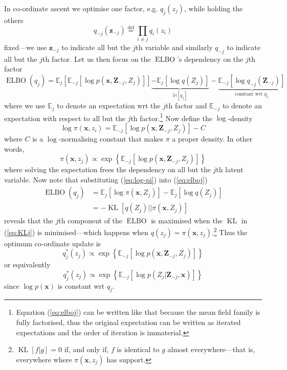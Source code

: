 \documentclass[11pt]{article}
\DeclareMathOperator{\KL}{KL}
\DeclareMathOperator{\ELBO}{ELBO}
\newcommand{\x}{\ensuremath{\mathbf x}}
\newcommand{\z}{\ensuremath{\mathbf z}}
\newcommand{\Z}{\ensuremath{\mathbf Z}}
\begin{document}
In co-ordinate ascent we optimise one factor, e.g. $q_j(z_j)$, while holding the others \begin{equation}
q_{-j}(\z_{-j}) \overset{\text{def}}{=} \prod_{i\neq j} q_i(z_i)
\end{equation}
fixed---we use $\z_{-j}$ to indicate all but the $j$th variable and similarly $q_{-j}$ to indicate all but the $j$th factor.
Let us then focus on the $\ELBO$'s dependency on the $j$th factor
\begin{equation}\label{eq:elboj}
\ELBO(q_j) = \mathbb E_{j}\left[ \mathbb E_{-j}\left[ \log p(\x, \Z_{-j}, Z_j)\right] \right] \underbrace{- \mathbb E_j\left[ \log q(Z_j)\right]}_{\mathbb H[q_j]} - \underbrace{\mathbb E_{-j}[ \log q_{-j}(\Z_{-j}) ]}_{\text{constant wrt }q_j}
\end{equation}
where we use $\mathbb E_j$ to denote an expectation wrt the $j$th factor and $\mathbb E_{-j}$ to denote an expectation with respect to all but the $j$th factor.\footnote{Equation (\ref{eq:elboj}) can be written like that because the mean field family is fully factorised, thus the original expectation can be written as iterated expectations and the order of iteration is immaterial.}
Now define the $\log$-density
\begin{equation}\label{eq:log-pi}
\log \pi(\x, z_i) = \mathbb E_{-j}\left[ \log p(\x, \Z_{-j}, Z_j)\right] - C
\end{equation}
where $C$ is a $\log$-normalising constant that makes $\pi$ a proper density.
In other words, 
\begin{equation}
\pi(\x, z_j) \propto \exp\left\{ \mathbb E_{-j}\left[ \log p(\x, \Z_{-j}, Z_j)\right] \right\} 
\end{equation}
where solving the expectation frees the dependency on all but the $j$th latent variable. 
Now note that substituting (\ref{eq:log-pi}) into (\ref{eq:elboj}) 
\begin{subequations}
\begin{align}
\ELBO(q_j) &= \mathbb E_{j}\left[ \log \pi(\x, Z_j) \right] - \mathbb E_j\left[ \log q(Z_j)\right] \\
&= -\KL\left[ q(Z_j) || \pi(\x, Z_j)\right] \label{eq:KLj}
\end{align}
\end{subequations}
reveals that the $j$th component of the $\ELBO$ is maximised when the $\KL$ in (\ref{eq:KLj}) is minimised---which happens when $q(z_j) = \pi(\x, z_j)$.\footnote{$\KL[f|g]=0$ if, and only if, $f$ is identical to $g$ almost everywhere---that is, everywhere where $\pi(\x, z_j)$ has support.}
Thus the optimum co-ordinate update is
\begin{equation}
q_j^*(z_j) \propto \exp\left\{ \mathbb E_{-j}\left[ \log p(\x, \Z_{-j}, Z_j)\right] \right\} 
\end{equation}
or equivalently 
\begin{equation}
q_j^*(z_j) \propto \exp\left\{ \mathbb E_{-j}\left[ \log p(Z_j| \Z_{-j}, \x)\right] \right\}
\end{equation}
since $\log p(\x)$ is constant wrt $q_j$.






\end{document}
